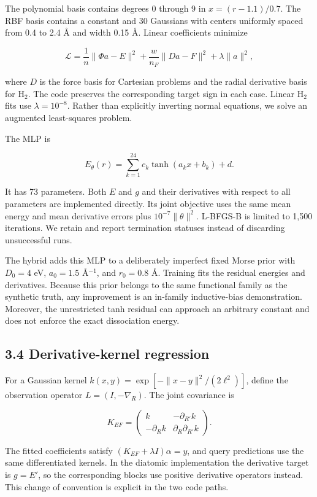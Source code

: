 \documentclass[
  11pt,
  a4paper,
]{article}
\begin{document}
The polynomial basis contains degrees 0 through 9 in \(x=(r-1.1)/0.7\).
The RBF basis contains a constant and 30 Gaussians with centers
uniformly spaced from 0.4 to 2.4 Å and width 0.15 Å. Linear coefficients
minimize

\[\mathcal L=\frac{1}{n}\|\Phi a-E\|^2+\frac{w}{n_F}\|Da-F\|^2+\lambda\|a\|^2,\]

where \(D\) is the force basis for Cartesian problems and the radial
derivative basis for H\(_2\). The code preserves the corresponding
target sign in each case. Linear H\(_2\) fits use \(\lambda=10^{-8}\).
Rather than explicitly inverting normal equations, we solve an augmented
least-squares problem.

The MLP is

\[E_\theta(r)=\sum_{k=1}^{24}c_k\tanh(a_kx+b_k)+d.\]

It has 73 parameters. Both \(E\) and \(g\) and their derivatives with
respect to all parameters are implemented directly. Its joint objective
uses the same mean energy and mean derivative errors plus
\(10^{-7}\|\theta\|^2\). L-BFGS-B is limited to 1,500 iterations. We
retain and report termination statuses instead of discarding
unsuccessful runs.

The hybrid adds this MLP to a deliberately imperfect fixed Morse prior
with \(D_0=4\) eV, \(a_0=1.5\) Å\(^{-1}\), and \(r_0=0.8\) Å. Training
fits the residual energies and derivatives. Because this prior belongs
to the same functional family as the synthetic truth, any improvement is
an in-family inductive-bias demonstration. Moreover, the unrestricted
tanh residual can approach an arbitrary constant and does not enforce
the exact dissociation energy.

\hypertarget{derivative-kernel-regression}{%
\subsection{3.4 Derivative-kernel
regression}\label{derivative-kernel-regression}}

For a Gaussian kernel \(k(x,y)=\exp[-\|x-y\|^2/(2\ell^2)]\), define the
observation operator \(L=(I,-\nabla_R)\). The joint covariance is

\[K_{EF}=\begin{pmatrix}k&-\partial_{R'}k\\-\partial_Rk&\partial_R\partial_{R'}k\end{pmatrix}.\]

The fitted coefficients satisfy \((K_{EF}+\lambda I)\alpha=y\), and
query predictions use the same differentiated kernels. In the diatomic
implementation the derivative target is \(g=E'\), so the corresponding
blocks use positive derivative operators instead. This change of
convention is explicit in the two code paths.
\end{document}
